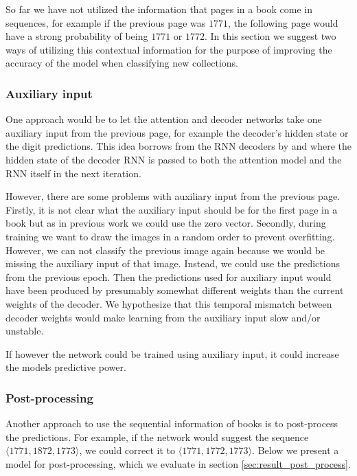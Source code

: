 So far we have not utilized the information that pages in a book come in sequences, for example if the previous page was $1771$, the following page would have a strong probability of being $1771$ or $1772$.
In this section we suggest two ways of utilizing this contextual information for the purpose of improving the accuracy of the model when classifying new collections.

\subsubsection{Auxiliary input}

One approach would be to let the attention and decoder networks take one auxiliary input from the previous page, for example the decoder's hidden state or the digit predictions. This idea borrows from the RNN decoders by \textcite{machine_translation_attention} and \textcite{AttendAndTell} where the hidden state of the decoder RNN is passed to both the attention model and the RNN itself in the next iteration.

However, there are some problems with auxiliary input from the previous page. Firstly, it is not clear what the auxiliary input should be for the first page in a book but as in previous work we could use the zero vector. Secondly, during training we want to draw the images in a random order to prevent overfitting. However, we can not classify the previous image again because we would be missing the auxiliary input of that image. Instead, we could use the predictions from the previous epoch. Then the predictions used for auxiliary input would have been produced by presumably somewhat different weights than the current weights of the decoder. We hypothesize that this temporal mismatch between decoder weights would make learning from the auxiliary input slow and/or unstable.

If however the network could be trained using auxiliary input, it could increase the models predictive power.

\subsubsection{Post-processing} \label{sssec:alt_postproc}

Another approach to use the sequential information of books is to post-process the predictions. For example, if the network would suggest the sequence $\langle 1771, 1872, 1773 \rangle$, we could correct it to $\langle 1771, 1772, 1773 \rangle$.
Below we present a model for post-processing, which we evaluate in section \ref{sec:result_post_process}.

